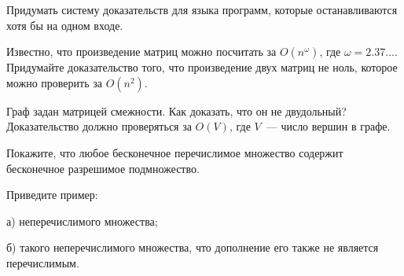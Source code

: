 \setcounter{curtask}{1}



\begin{frame}


\begin{task}
	Придумать систему доказательств для языка программ, которые останавливаются
    хотя бы на одном входе.
\end{task}

\begin{task}
    Известно, что произведение матриц можно посчитать за $O(n^{\omega})$, где $\omega
    =  2.37...$. Придумайте доказательство того, что произведение двух матриц не
    ноль, которое можно проверить за $O(n^2)$.
\end{task}


\begin{task}
    Граф задан матрицей смежности. Как доказать, что он не двудольный? Доказательство
    должно проверяться за $O(V)$, где $V$~--- число вершин в графе.
\end{task}

\begin{task}
	Покажите, что любое бесконечное перечислимое множество содержит бесконечное
    разрешимое подмножество.    
\end{task}

\begin{task}
    Приведите пример:
    
    а) неперечислимого множества;

    б) такого неперечислимого множества, что дополнение его также не является
    перечислимым.
\end{task}

\end{frame}